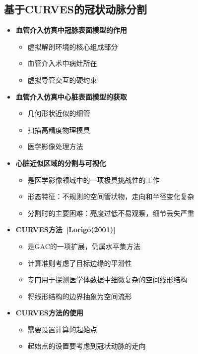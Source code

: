 \subsection[冠状动脉分割I]{基于CURVES的冠状动脉分割}

\begin{frame}
\begin{itemize}
\item \textbf{血管介入仿真中冠脉表面模型的作用}
\begin{itemize}
\item 虚拟解剖环境的核心组成部分
\item 血管介入术中病灶所在
\item 虚拟导管交互的硬约束
\end{itemize}
\pause \item \textbf{血管介入仿真中心脏表面模型的获取}
\begin{itemize}
\item 几何形状近似的细管
\item 扫描高精度物理模具
\item 医学影像处理方法
\end{itemize}
\pause \item \textbf{心脏近似区域的分割与可视化}
\begin{itemize}
\item 是医学影像领域中的一项极具挑战性的工作
\item 形态特征：不规则的空间管状物，走向和半径变化复杂
\item 分割时的主要困难：亮度过低不易观察，细节丢失严重
\end{itemize}
\end{itemize}
\end{frame}

\begin{frame}
\begin{itemize}
\pause \item \textbf{CURVES方法~[Lorigo(2001)]}
\begin{itemize}
\item 是GAC的一项扩展，仍属水平集方法
\item 计算准则考虑了目标边缘的平滑性
\item 专门用于探测医学体数据中细微复杂的空间线形结构
\item 将线形结构的边界抽象为空间流形
\end{itemize}
\pause \item \textbf{CURVES方法的使用}
\begin{itemize}
\item 需要设置计算的起始点
\item 起始点的设置要考虑到冠状动脉的走向
\end{itemize}
\end{itemize}
\end{frame}

